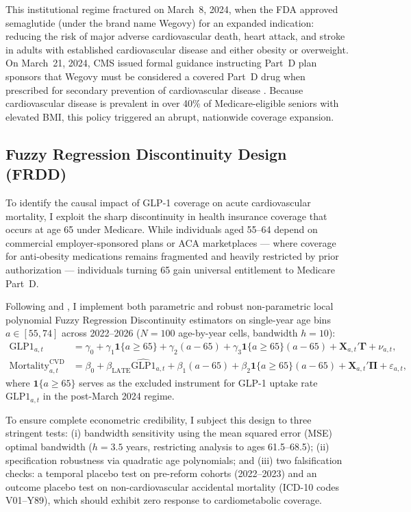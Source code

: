 \documentclass[11pt,a4paper]{article}
\begin{document}
This institutional regime fractured on March~8, 2024, when the FDA approved semaglutide (under the brand name Wegovy) for an expanded indication: reducing the risk of major adverse cardiovascular death, heart attack, and stroke in adults with established cardiovascular disease and either obesity or overweight. On March~21, 2024, CMS issued formal guidance instructing Part~D plan sponsors that Wegovy must be considered a covered Part~D drug when prescribed for secondary prevention of cardiovascular disease \citep{cms2024guidance}. Because cardiovascular disease is prevalent in over 40\% of Medicare-eligible seniors with elevated BMI, this policy triggered an abrupt, nationwide coverage expansion.

\subsection{Fuzzy Regression Discontinuity Design (FRDD)}
To identify the causal impact of GLP-1 coverage on acute cardiovascular mortality, I exploit the sharp discontinuity in health insurance coverage that occurs at age 65 under Medicare. While individuals aged 55--64 depend on commercial employer-sponsored plans or ACA marketplaces --- where coverage for anti-obesity medications remains fragmented and heavily restricted by prior authorization --- individuals turning 65 gain universal entitlement to Medicare Part~D.

Following \citet{cattaneo2020practical} and \citet{calonico2014robust}, I implement both parametric and robust non-parametric local polynomial Fuzzy Regression Discontinuity estimators on single-year age bins $a \in [55, 74]$ across 2022--2026 ($N = 100$ age-by-year cells, bandwidth $h = 10$):
\begin{align}
    \text{GLP1}_{a, t} &= \gamma_0 + \gamma_1 \mathbf{1}\{a \ge 65\} + \gamma_2 (a - 65) + \gamma_3 \mathbf{1}\{a \ge 65\}(a - 65) + \mathbf{X}_{a, t}' \boldsymbol{\Gamma} + \nu_{a, t}, \label{eq:frdd_first} \\
    \text{Mortality}_{a, t}^{\text{CVD}} &= \beta_0 + \beta_{\text{LATE}} \widehat{\text{GLP1}}_{a, t} + \beta_1 (a - 65) + \beta_2 \mathbf{1}\{a \ge 65\}(a - 65) + \mathbf{X}_{a, t}' \boldsymbol{\Pi} + \varepsilon_{a, t}, \label{eq:frdd_2sls}
\end{align}
where $\mathbf{1}\{a \ge 65\}$ serves as the excluded instrument for GLP-1 uptake rate $\text{GLP1}_{a, t}$ in the post-March 2024 regime. 

To ensure complete econometric credibility, I subject this design to three stringent tests: (i) bandwidth sensitivity using the mean squared error (MSE) optimal bandwidth ($h = 3.5$ years, restricting analysis to ages 61.5--68.5); (ii) specification robustness via quadratic age polynomials; and (iii) two falsification checks: a temporal placebo test on pre-reform cohorts (2022--2023) and an outcome placebo test on non-cardiovascular accidental mortality (ICD-10 codes V01--Y89), which should exhibit zero response to cardiometabolic coverage.
\end{document}
